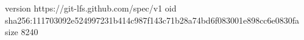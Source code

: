 version https://git-lfs.github.com/spec/v1
oid sha256:111703092e524997231b414c987f143c71b28a74bd6f083001e898cc6e0830fa
size 8240
